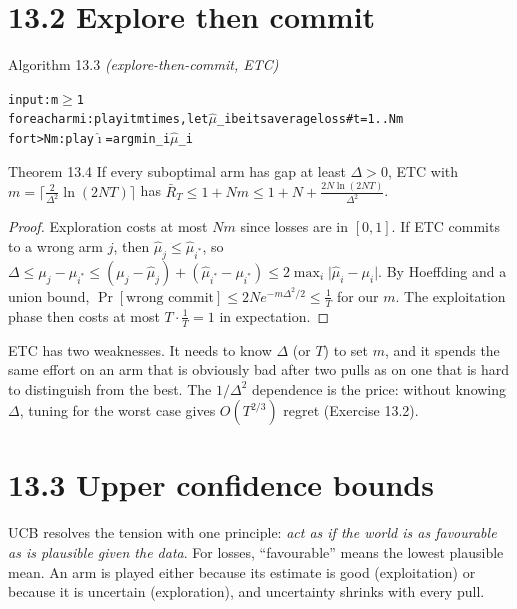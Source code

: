\documentclass[11pt,a4paper,openany]{book}
\newcommand{\abs}[1]{\lvert #1\rvert}
\newenvironment{algo}{\par\smallskip\begingroup\footnotesize\begin{alltt}}{\end{alltt}\endgroup\smallskip}
\begin{document}
\section*{13.2 Explore then commit}\label{ch13-etc}

\begin{balg}{Algorithm 13.3 \emph{(explore-then-commit, ETC)}}
\begin{algo}
input: m \ensuremath{\ge} 1
for each arm i: play it m times, let \ensuremath{\hat{\mu}}\_i be its average loss   \# t = 1..Nm
for t > Nm: play \ensuremath{\hat\imath} = argmin\_i \ensuremath{\hat{\mu}}\_i
\end{algo}
\end{balg}

\begin{bthm}{Theorem 13.4}
If every suboptimal arm has gap at least $\Delta>0$, ETC with $m=\big\lceil\frac2{\Delta^2}\ln(2NT)\big\rceil$ has $\bar R_T\le1+Nm\le 1+N+\frac{2N\ln(2NT)}{\Delta^2}$.
\end{bthm}

\begin{proof}
Exploration costs at most $Nm$ since losses are in $[0,1]$. If ETC commits to a wrong arm $j$, then $\hat\mu_j\le\hat\mu_{i^*}$, so $\Delta\le\mu_j-\mu_{i^*}\le(\mu_j-\hat\mu_j)+(\hat\mu_{i^*}-\mu_{i^*})\le2\max_i\abs{\hat\mu_i-\mu_i}$. By Hoeffding and a union bound, $\Pr[\text{wrong commit}]\le2Ne^{-m\Delta^2/2}\le\frac1T$ for our $m$. The exploitation phase then costs at most $T\cdot\frac1T=1$ in expectation.
\end{proof}

ETC has two weaknesses. It needs to know $\Delta$ (or $T$) to set $m$, and it spends the same effort on an arm that is obviously bad after two pulls as on one that is hard to distinguish from the best. The $1/\Delta^2$ dependence is the price: without knowing $\Delta$, tuning for the worst case gives $O(T^{2/3})$ regret (Exercise 13.2).

\section*{13.3 Upper confidence bounds}\label{ch13-ucb}

UCB resolves the tension with one principle: \emph{act as if the world is as favourable as is plausible given the data}. For losses, ``favourable'' means the lowest plausible mean. An arm is played either because its estimate is good (exploitation) or because it is uncertain (exploration), and uncertainty shrinks with every pull.
\end{document}
